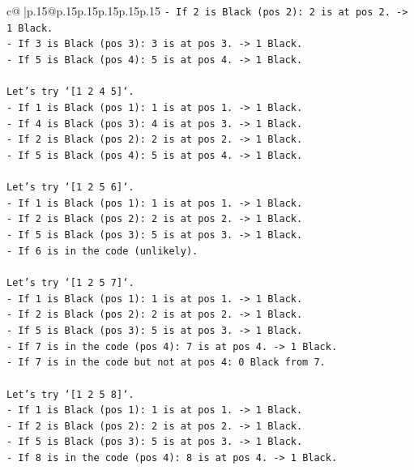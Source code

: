 \documentclass{article}
\begin{document}
{\begin{supertabular}{c@{$\;$}|p{.15\linewidth}@{}p{.15\linewidth}p{.15\linewidth}p{.15\linewidth}p{.15\linewidth}p{.15\linewidth}}
{{{\texttt{{-} If 2 is Black (pos 2): 2 is at pos 2. {-}> 1 Black.} \\
\texttt{{-} If 3 is Black (pos 3): 3 is at pos 3. {-}> 1 Black.} \\
\texttt{{-} If 5 is Black (pos 4): 5 is at pos 4. {-}> 1 Black.} \\
\\ 
\texttt{Let's try `{[}1 2 4 5{]}`.} \\
\texttt{{-} If 1 is Black (pos 1): 1 is at pos 1. {-}> 1 Black.} \\
\texttt{{-} If 4 is Black (pos 3): 4 is at pos 3. {-}> 1 Black.} \\
\texttt{{-} If 2 is Black (pos 2): 2 is at pos 2. {-}> 1 Black.} \\
\texttt{{-} If 5 is Black (pos 4): 5 is at pos 4. {-}> 1 Black.} \\
\\ 
\texttt{Let's try `{[}1 2 5 6{]}`.} \\
\texttt{{-} If 1 is Black (pos 1): 1 is at pos 1. {-}> 1 Black.} \\
\texttt{{-} If 2 is Black (pos 2): 2 is at pos 2. {-}> 1 Black.} \\
\texttt{{-} If 5 is Black (pos 3): 5 is at pos 3. {-}> 1 Black.} \\
\texttt{{-} If 6 is in the code (unlikely).} \\
\\ 
\texttt{Let's try `{[}1 2 5 7{]}`.} \\
\texttt{{-} If 1 is Black (pos 1): 1 is at pos 1. {-}> 1 Black.} \\
\texttt{{-} If 2 is Black (pos 2): 2 is at pos 2. {-}> 1 Black.} \\
\texttt{{-} If 5 is Black (pos 3): 5 is at pos 3. {-}> 1 Black.} \\
\texttt{{-} If 7 is in the code (pos 4): 7 is at pos 4. {-}> 1 Black.} \\
\texttt{{-} If 7 is in the code but not at pos 4: 0 Black from 7.} \\
\\ 
\texttt{Let's try `{[}1 2 5 8{]}`.} \\
\texttt{{-} If 1 is Black (pos 1): 1 is at pos 1. {-}> 1 Black.} \\
\texttt{{-} If 2 is Black (pos 2): 2 is at pos 2. {-}> 1 Black.} \\
\texttt{{-} If 5 is Black (pos 3): 5 is at pos 3. {-}> 1 Black.} \\
\texttt{{-} If 8 is in the code (pos 4): 8 is at pos 4. {-}> 1 Black.} \\
}}}
\end{supertabular}}
\end{document}
